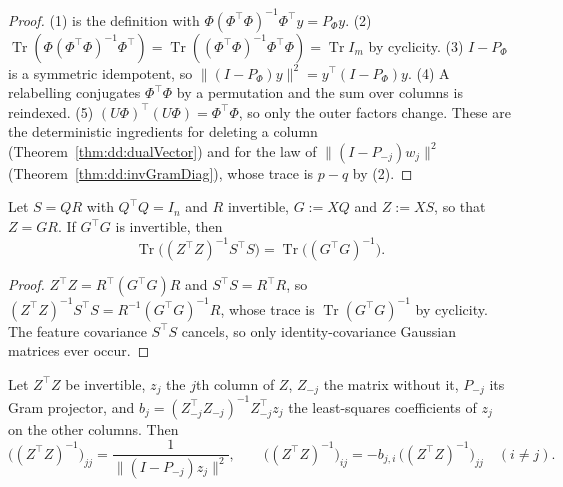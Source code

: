\begin{proof}
  \leanok
(1) is the definition with $\Phi(\Phi^\top\Phi)^{-1}\Phi^\top y=P_\Phi y$. (2) $\operatorname{Tr}(\Phi(\Phi^\top\Phi)^{-1}\Phi^\top)=\operatorname{Tr}((\Phi^\top\Phi)^{-1}\Phi^\top\Phi)=\operatorname{Tr}I_m$ by cyclicity. (3) $I-P_\Phi$ is a symmetric idempotent, so
$\|(I-P_\Phi)y\|^2=y^\top(I-P_\Phi)y$. (4) A relabelling conjugates $\Phi^\top\Phi$ by a permutation and the sum over columns is reindexed. (5) $(U\Phi)^\top(U\Phi)=\Phi^\top\Phi$, so only the outer factors change.
These are the deterministic ingredients for deleting a column (Theorem~\ref{thm:dd:dualVector}) and for the law of $\|(I-P_{-j})w_j\|^2$ (Theorem~\ref{thm:dd:invGramDiag}), whose trace is $p-q$ by (2).
\end{proof}

\begin{theorem}\label{thm:dd:traceReduction}
  \leanok
Let $S=QR$ with $Q^\top Q=I_n$ and $R$ invertible, $G:=XQ$ and $Z:=XS$, so that $Z=GR$. If $G^\top G$ is invertible, then
\[
  \operatorname{Tr}\bigl((Z^\top Z)^{-1}S^\top S\bigr)=\operatorname{Tr}\bigl((G^\top G)^{-1}\bigr).
\]
\end{theorem}

\begin{proof}
  \leanok
$Z^\top Z=R^\top(G^\top G)R$ and $S^\top S=R^\top R$, so $(Z^\top Z)^{-1}S^\top S=R^{-1}(G^\top G)^{-1}R$, whose trace is
$\operatorname{Tr}(G^\top G)^{-1}$ by cyclicity. The feature covariance $S^\top S$ cancels, so only identity-covariance Gaussian matrices ever occur.
\end{proof}

\begin{theorem}\label{thm:dd:dualVector}
  \leanok
Let $Z^\top Z$ be invertible, $z_j$ the $j$th column of $Z$, $Z_{-j}$ the matrix without it, $P_{-j}$ its Gram projector, and
$b_j=(Z_{-j}^\top Z_{-j})^{-1}Z_{-j}^\top z_j$ the least-squares coefficients of $z_j$ on the other columns. Then
\[
  \bigl((Z^\top Z)^{-1}\bigr)_{jj}=\frac1{\|(I-P_{-j})z_j\|^2},\qquad
  \bigl((Z^\top Z)^{-1}\bigr)_{ij}=-b_{j,i}\,\bigl((Z^\top Z)^{-1}\bigr)_{jj}\quad(i\neq j).
\]
\end{theorem}

